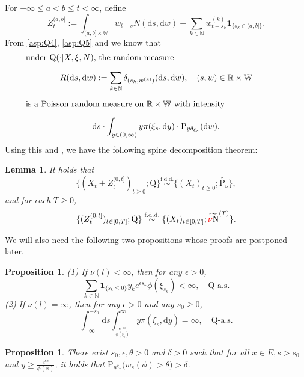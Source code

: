 \documentclass[12pt,a4paper]{amsart}
\numberwithin{equation}{section}
\theoremstyle{plain}
\newtheorem{lem}[thm]{Lemma}
\newtheorem{prop}[thm]{Proposition}
\theoremstyle{definition}
\theoremstyle{remark}
\begin{document}
	For $-\infty \leq a < b \leq t<\infty$, define
\begin{equation} \label{eq:E.4}
	Z_t^{(a,b]}
	:= \int_{(a,b]\times \mathbb W} w_{t-s} N(\mathrm ds,\mathrm dw) + \sum_{k\in \mathbb N} w^{(k)}_{t-s_k} \mathbf 1_{\{s_k \in (a,b]\}}.
\end{equation}
	From \eqref{asp:Q4}, \eqref{asp:Q5} and \cite[Theorem 3.2(i)]{Kallenberg2017Random} we know that
\begin{equation}\label{eq:E.45}
\begin{minipage}{0.9\textwidth}
	under $\mathrm Q(\cdot | X, \xi, N)$, the random measure
\[
	R(\mathrm ds,\mathrm dw)
	:=\sum_{k\in \mathbb N} \delta_{(s_k, w^{(k)})}(\mathrm ds,\mathrm dw),
	\quad (s,w)\in \mathbb R\times \mathbb W
\]
	is a Poisson random measure on $\mathbb R \times \mathbb W$ with intensity
	\[
	\mathrm ds \cdot \int_{y\in (0,\infty)} y \pi(\xi_s, \mathrm dy)\cdot \mathrm P_{y\delta_{\xi_s}}(\mathrm dw).
	\]
\end{minipage}
\end{equation}
	Using this and \cite[Theorem 1.5 \& Corollary 1.6]{RenSongSun2020Spine}, we have the following spine decomposition theorem:
\begin{lem} \label{thm:E.2}
	It holds that
	\[
	\{(X_t + Z_t^{(0,t]})_{t\geq 0}; \mathrm Q\} \overset{\text{f.d.d.}}\sim \{(X_t)_{t\geq 0}; \widetilde{\mathrm P_\nu}\},
	\]
	and for each $T\geq 0$,
\[
	\{(Z_t^{(0,t]})_{t\in [0,T]}; \mathrm Q\} \overset{\text{f.d.d.}} \sim \{ (X_t)_{t\in [0,T]}; \widetilde{{\color{red}\nu}\mathrm N}^{(T)}\}.
\]
\end{lem}
	We will also need the following two propositions whose proofs are postponed later.
\begin{prop}\label{thm:E.4}	
	(1) If $\nu(l)<\infty$,
	then for any $\epsilon>0$,
\[
	\sum_{k\in \mathbb N} \mathbf 1_{\{s_k \leq 0\}} y_k e^{\epsilon s_k} \phi(\xi_{s_k})
	< \infty,
	\quad \mathrm Q\text{-a.s.}
\]
	(2) If  $ \nu(l)=\infty$,
	then for any $\epsilon>0$ and any $s_0\geq 0$,
   	\begin{equation}
	\int^{-s_0}_{-\infty} {\mathrm d}s
	\int_{\frac{e^{-\epsilon s}}{\phi(\xi_s)}}^\infty y\pi(\xi_s,{\mathrm d}y)
     	=\infty,
	\quad {\mathrm Q}\text{-a.s.}
	\end{equation}
\end{prop}
\begin{prop} \label{thm:E.5}
 	There exist $s_0, \epsilon, \theta>0$ and $\delta > 0$  such that for all $x\in E, s>s_0$ and $y\geq \frac{e^{\epsilon s}}{ \phi(x)}$, it holds that $\mathrm P_{y \delta_{x}}\big(w_{s}(\phi)>\theta\big) > \delta$.
\end{prop}
\end{document}
